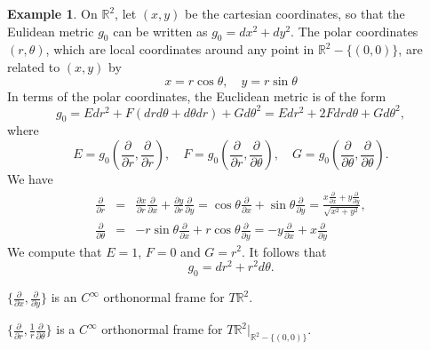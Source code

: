 \documentclass{amsart}
\numberwithin{equation}{section}
\newcommand{\bR}{\mathbb{R}}
\theoremstyle{definition}
\newtheorem{example}[definition]{Example}
\theoremstyle{theorem}
\begin{document}
\begin{example}
On $\bR^2$, let $(x,y)$ be the cartesian coordinates, so that the Eulidean metric
$g_0$ can be written as $g_0= dx^2 + dy^2$. The polar coordinates $(r,\theta)$, which
are local coordinates around any point in $\bR^2-\{(0,0)\}$, are related to
$(x,y)$ by
$$
x = r\cos\theta,\quad  y = r \sin \theta
$$
In terms of the polar coordinates, the Euclidean metric is of the form  
\[
g_0 = E dr^2 + F(drd\theta + d\theta dr) + Gd\theta^2 = E dr^2 +2F drd\theta + Gd\theta^2,
\]
where 
$$
E = g_0(\frac{\partial}{\partial r}, \frac{\partial}{\partial r}),\quad
F = g_0(\frac{\partial}{\partial r}, \frac{\partial}{\partial \theta}),\quad
G = g_0(\frac{\partial}{\partial \theta}, \frac{\partial}{\partial \theta}).
$$
We have
\begin{eqnarray*}
\frac{\partial}{\partial r} &=& 
\frac{\partial x}{\partial r} \frac{\partial}{\partial x} + \frac{\partial y}{\partial r} \frac{\partial}{\partial y} 
= \cos\theta  \frac{\partial}{\partial x} + \sin\theta  \frac{\partial}{\partial y} 
= \frac{x \frac{\partial}{\partial x} + y \frac{\partial}{\partial y}}{\sqrt{x^2 + y^2}},\\
\frac{\partial}{\partial \theta} &=& 
-r\sin\theta  \frac{\partial}{\partial x} + r\cos\theta \frac{\partial}{\partial y}=
-y \frac{\partial}{\partial x} + x \frac{\partial}{\partial y}
\end{eqnarray*}
We compute that $E = 1$, $F = 0$ and $G = r^2$. It follows that 
\[
g_0 = dr^2 + r^2d\theta.
\]

$\{ \frac{\partial}{\partial x}, \frac{\partial}{\partial y}\}$ is an $C^\infty$ orthonormal frame
for $T\bR^2$. 

$\{ \frac{\partial}{\partial r}, \frac{1}{r}\frac{\partial}{\partial \theta}\}$ is
a $C^\infty$ orthonormal frame for $T\bR^2|_{\bR^2-\{(0,0)\}}$.  

\end{example}
\end{document}
